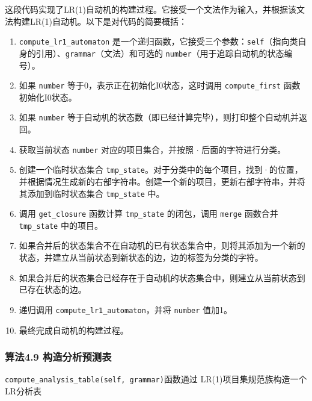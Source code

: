 \documentclass[lang=cn,11pt,a4paper]{elegantpaper}
\begin{document}
这段代码实现了LR(1)自动机的构建过程。它接受一个文法作为输入，并根据该文法构建LR(1)自动机。以下是对代码的简要概括：
\begin{enumerate}
    \item \lstinline{compute_lr1_automaton} 是一个递归函数，它接受三个参数：\lstinline{self}（指向类自身的引用）、\lstinline{grammar}（文法）和可选的 \lstinline{number}（用于追踪自动机的状态编号）。
    \item 如果 \lstinline{number} 等于0，表示正在初始化I0状态，这时调用 \lstinline{compute_first} 函数初始化I0状态。
    \item 如果 \lstinline{number} 等于自动机的状态数（即已经计算完毕），则打印整个自动机并返回。
    \item 获取当前状态 \lstinline{number} 对应的项目集合，并按照 $\cdot$ 后面的字符进行分类。
    \item 创建一个临时状态集合 \lstinline{tmp_state}。对于分类中的每个项目，找到·的位置，并根据情况生成新的右部字符串。创建一个新的项目，更新右部字符串，并将其添加到临时状态集合 \lstinline{tmp_state} 中。
    \item 调用 \lstinline{get_closure} 函数计算 \lstinline{tmp_state} 的闭包，调用 \lstinline{merge} 函数合并 \lstinline{tmp_state} 中的项目。
    \item 如果合并后的状态集合不在自动机的已有状态集合中，则将其添加为一个新的状态，并建立从当前状态到新状态的边，边的标签为分类的字符。
    \item 如果合并后的状态集合已经存在于自动机的状态集合中，则建立从当前状态到已存在状态的边。
    \item 递归调用 \lstinline{compute_lr1_automaton}，并将 \lstinline{number} 值加1。
    \item 最终完成自动机的构建过程。
\end{enumerate}


\subsubsection{算法4.9 构造分析预测表}

\lstinline{compute_analysis_table(self, grammar)}函数通过 LR(1)项目集规范族构造一个LR分析表
\end{document}
